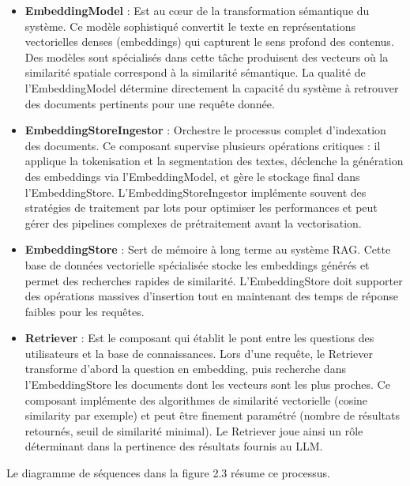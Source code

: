 \documentclass[12pt,a4paper]{report}
\begin{document}
\begin{itemize}
		\item \textbf{EmbeddingModel} : Est au cœur de la transformation sémantique du système. Ce modèle sophistiqué convertit le texte en représentations vectorielles denses (embeddings) qui capturent le sens profond des contenus. Des modèles sont spécialisés dans cette tâche produisent des vecteurs où la similarité spatiale correspond à la similarité sémantique. La qualité de l'EmbeddingModel détermine directement la capacité du système à retrouver des documents pertinents pour une requête donnée.
		
		\item \textbf{EmbeddingStoreIngestor} : Orchestre le processus complet d'indexation des documents. Ce composant supervise plusieurs opérations critiques : il applique la tokenisation et la segmentation des textes, déclenche la génération des embeddings via l'EmbeddingModel, et gère le stockage final dans l'EmbeddingStore. L'EmbeddingStoreIngestor implémente souvent des stratégies de traitement par lots pour optimiser les performances et peut gérer des pipelines complexes de prétraitement avant la vectorisation.
		
		\item \textbf{EmbeddingStore} : Sert de mémoire à long terme au système RAG. Cette base de données vectorielle spécialisée stocke les embeddings générés et permet des recherches rapides de similarité. L'EmbeddingStore doit supporter des opérations massives d'insertion tout en maintenant des temps de réponse faibles pour les requêtes.
		
		\item \textbf{Retriever} : Est le composant qui établit le pont entre les questions des utilisateurs et la base de connaissances. Lors d'une requête, le Retriever transforme d'abord la question en embedding, puis recherche dans l'EmbeddingStore les documents dont les vecteurs sont les plus proches. Ce composant implémente des algorithmes de similarité vectorielle (cosine similarity par exemple) et peut être finement paramétré (nombre de résultats retournés, seuil de similarité minimal). Le Retriever joue ainsi un rôle déterminant dans la pertinence des résultats fournis au LLM.
		
	\end{itemize}
	
	Le diagramme de séquences dans la figure 2.3 résume ce processus.
	
\end{document}
